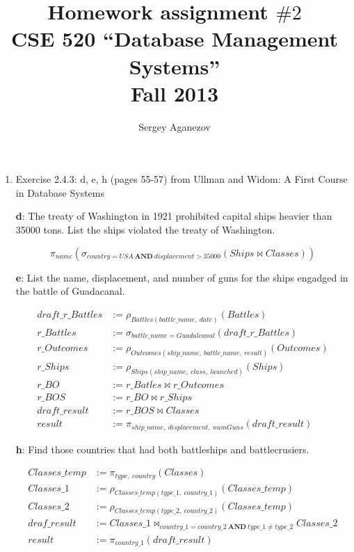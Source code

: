 \documentclass[a4paper,11pt]{article}
\author{Sergey Aganezov}
\title{Homework assignment $\#2$ \\ CSE 520 ``Database Management Systems'' \\ Fall 2013}
\date{}
\newcommand{\selection}[2]{\sigma_{#1}\left(#2\right)}
\newcommand{\projection}[2]{\pi_{#1}\left(#2\right)}
\newcommand{\natJoin}[2]{#1 \Join #2}
\newcommand{\thJoin}[3]{#1 \Join_{#3} #2}
\newcommand{\rename}[3]{\rho_{#1(#2)}\left(#3\right)}
\begin{document}
	\maketitle
	\begin{enumerate}
		\item Exercise 2.4.3: d, e, h (pages 55-57) from Ullman and Widom: A First Course in Database Systems


		\textbf{d}: The treaty of Washington in 1921 prohibited capital ships heavier than 35000 tons. List the ships violated the treaty of Washington.

		\begin{equation*}
			\projection{name}{
				\selection{country=USA\ \mathbf{AND}\ displacement > 35000}{
					\natJoin{Ships}{Classes}
				}
			}
		\end{equation*}

		\textbf{e}: List the name, displacement, and number of guns for the ships engadged in the battle of Guadacanal.

		\begin{align*}
			draft\_r\_Battles &:= \rename{Battles}{battle\_name,\ date}{Battles} \\
			r\_Battles &:= \selection{battle\_name=Guadalcanal}{draft\_r\_Battles} \\
			r\_Outcomes &:= \rename{Outcomes}{ship\_name,\ battle\_name,\ result}{Outcomes} \\
			r\_Ships &:= \rename{Ships}{ship\_name,\ class,\ launched}{Ships} \\
			r\_BO &:= \natJoin{r\_Batles}{r\_Outcomes} \\
			r\_BOS &:= \natJoin{r\_BO}{r\_Ships} \\
			draft\_result &:= \natJoin{r\_BOS}{Classes} \\
			result &:= \projection{ship\_name,\ displacement,\ numGuns}{draft\_result}
		\end{align*}

		\textbf{h}: Find those countries that had both battleships and battlecrusiers.

		\begin{align*}
			Classes\_temp &:= \projection{type,\ country}{Classes} \\
			Classes\_1 &:= \rename{Classes\_temp}{type\_1,\ country\_1}{Classes\_temp} \\
			Classes\_2 &:= \rename{Classes\_temp}{type\_2,\ country\_2}{Classes\_temp} \\
			draf\_result &:= \thJoin{Classes\_1}{Classes\_2}{country\_1= country\_2\ \mathbf{AND}\ type\_1 \neq type\_2} \\
			result &:= \projection{country\_1}{draft\_result} \\
		\end{align*}
			

\end{enumerate}
\end{document}

